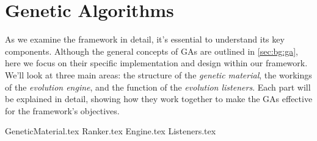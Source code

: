 \section{Genetic Algorithms}
\label{sec:genetic_algorithms}
    As we examine the framework in detail, it's essential to understand its key components. Although the general 
    concepts of GAs are outlined in \vref{sec:bg:ga}, here we focus on their specific implementation and design within 
    our framework. We'll look at three main areas: the structure of the \emph{genetic material}, the workings of the 
    \emph{evolution engine}, and the function of the \emph{evolution listeners}. Each part will be explained in detail, 
    showing how they work together to make the GAs effective for the framework's objectives.
    
    {GeneticMaterial.tex}
    {Ranker.tex}
    {Engine.tex}    
    {Listeners.tex}
